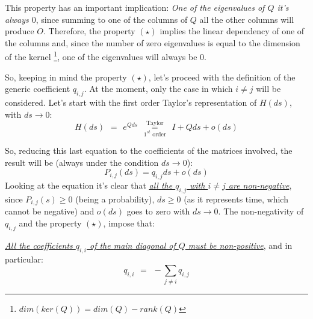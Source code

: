 \documentclass[12pt,a4paper]{article}
\begin{document}
\bigskip\noindent
This property has an important implication: 
\emph{One of the eigenvalues of $Q$ it's always $0$}, since summing to one of the columns of $Q$ all the other columns will produce $O$. Therefore, the property $(\star )$ implies the linear dependency of one of the columns and, since the number of zero eigenvalues is equal to the dimension of the kernel \footnote[2]{$dim(ker(Q))=dim(Q)-rank(Q)$}, one of the eigenvalues will always be $0$.

\bigskip\noindent
So, keeping in mind the property $(\star )$, let's proceed with the definition of the generic coefficient $q_{i,j}$. At the moment, only the case in which $i\neq j$ will be considered. Let's start with the first order Taylor's representation of $H(ds)$, with $ds\rightarrow 0$:
$$
H(ds) \hspace{5pt} =\hspace{5pt}e^{Qds}
\hspace{5pt}
\overset{\textrm{Taylor}}{\underset{1^{st}\textrm{ order}}{=}}
\hspace{5pt}
I+Qds+o(ds)
$$ 

\bigskip\noindent
So, reducing this last equation to the coefficients of the matrices involved, the result will be 
(always under the condition $ds\rightarrow 0$):
$$
P_{i,j}(ds)=q_{i,j}ds+o(ds)
$$
Looking at the equation it's clear that \underline{\emph{all the $q_{i,j}$ with $i\neq j$ are non-negative}}, since $P_{i,j}(s)\geq 0$ (being a probability), $ds\geq 0$ (as it represents time, which cannot be negative) and $o(ds)$ goes to zero with $ds\rightarrow 0$. 
\newpage
\noindent
The non-negativity of $q_{i,j}$ and the property $(\star )$, impose that:

\bigskip\noindent
\underline{\emph{All the coefficients $q_{i,i}$ of the main diagonal of $Q$ must be non-positive}}, and in particular:
$$
q_{i,i}
\hspace{5pt}=\hspace{5pt}-
\sum_{j\neq i}{q_{i,j}}
$$
\end{document}
